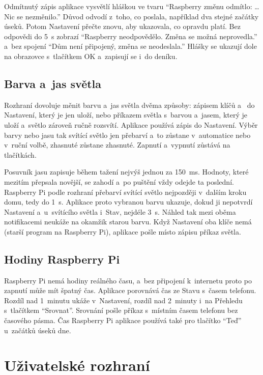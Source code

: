 Odmítnutý zápis aplikace vysvětlí hláškou ve tvaru \enquote{Raspberry změnu odmítlo: \dots{} Nic se
nezměnilo.} Důvod odvodí z~toho, co poslala, například dva stejné začátky úseků. Potom
Nastavení přečte znovu, aby ukazovala, co opravdu platí. Bez odpovědi do 5~s zobrazí
\enquote{Raspberry neodpovědělo. Změna se možná neprovedla.} a~bez spojení
\enquote{Dům není připojený, změna se neodeslala.} Hlášky se ukazují dole na obrazovce
s~tlačítkem OK a~zapisují se i~do deníku.

\subsection{Barva a~jas světla}

Rozhraní dovoluje měnit barvu a~jas světla dvěma způsoby: zápisem klíčů 
a~ do Nastavení, který je jen uloží, nebo příkazem světla s~barvou a~jasem,
který je uloží a~světlo zároveň ručně rozsvítí. Aplikace používá zápis do Nastavení. Výběr barvy
nebo jasu tak svítící světlo jen přebarví a~to zůstane v~automatice nebo v~ruční volbě, zhasnuté
zůstane zhasnuté. Zapnutí a~vypnutí zůstává na tlačítkách.

Posuvník jasu zapisuje během tažení nejvýš jednou za 150~ms. Hodnoty, které mezitím přepsala
novější, se zahodí a~po puštění vždy odejde ta poslední. Raspberry Pi podle rozhraní přebarví
svítící světlo nejpozději v~dalším kroku domu, tedy do 1~s. Aplikace proto vybranou barvu
ukazuje, dokud ji nepotvrdí Nastavení a~u~svítícího světla i~Stav, nejdéle 3~s. Náhled tak
mezi oběma notifikacemi neukáže na okamžik starou barvu. Když Nastavení oba klíče nemá (starší
program na Raspberry Pi), aplikace pošle místo zápisu příkaz světla.

\subsection{Hodiny Raspberry Pi}

Raspberry Pi nemá hodiny reálného času, a~bez připojení k~internetu proto po zapnutí může mít
špatný čas. Aplikace porovnává čas ze Stavu s~časem telefonu. Rozdíl nad 1~minutu ukáže
v~Nastavení, rozdíl nad 2~minuty i~na Přehledu s~tlačítkem \enquote{Srovnat}. Srovnání pošle
příkaz  s~místním časem telefonu bez časového pásma. Čas
Raspberry Pi aplikace používá také pro tlačítko \enquote{Teď} u~začátků úseků dne.

\section{Uživatelské rozhraní}
\label{sec:app-ui}

